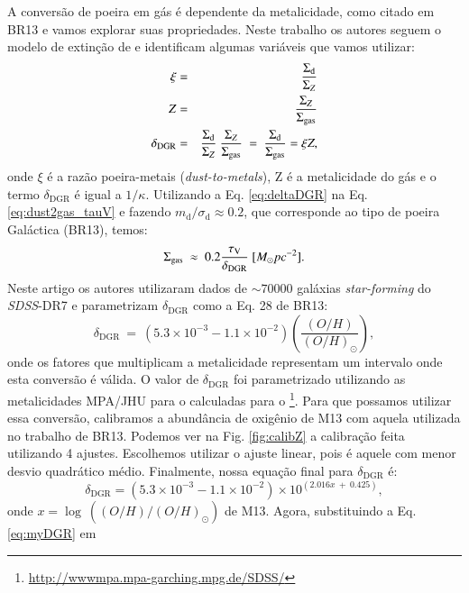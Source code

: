 A conversão de poeira em gás é dependente da metalicidade, como citado em BR13 e vamos explorar suas
propriedades. Neste trabalho os autores seguem o modelo de extinção de \citet{Charlot.Fall.2000a} e
identificam algumas variáveis que vamos utilizar:
\begin{eqnarray}
	\xi &=& \frac{\Sigma_{\mathrm{d}}}{\Sigma_Z} \\
	Z &=& \frac{\Sigma_Z}{\SigmaGas}  \\
	\delta_{\mathrm{DGR}} &=& \frac{\Sigma_{\mathrm{d}}}{\Sigma_Z}\	\frac{\Sigma_Z}{\SigmaGas}\ =\ \frac{\Sigma_{\mathrm{d}}}{\SigmaGas} = \xi Z,
	\label{eq:deltaDGR}
\end{eqnarray}
\noindent onde $\xi$ é a razão poeira-metais ({\em dust-to-metals}), Z é a metalicidade do gás e o
termo $\delta_{\mathrm{DGR}}$ é igual a $1/\kappa$. Utilizando a Eq. \ref{eq:deltaDGR} na Eq.
\ref{eq:dust2gas_tauV} e fazendo $m_{\mathrm{d}}/\sigma_{\mathrm{d}} \approx 0.2$, que corresponde
ao tipo de poeira Galáctica (BR13), temos:
\begin{equation}
	\Sigma_{\mathrm{gas}}\ \approx\ 0.2 \frac{\tau_{\mathrm{V}}}{\delta_{\mathrm{DGR}}}\ [M_\odot pc^{-2}].
	\label{eq:SigmaGasBR}
\end{equation}
Neste artigo os autores utilizaram dados de $\sim 70000$ galáxias {\em star-forming} do
\textit{SDSS}-DR7 e parametrizam $\delta_{\mathrm{DGR}}$ como a Eq. 28 de BR13:
\begin{equation}
	\delta_{\mathrm{DGR}}\ =\ (5.3 \times 10^{-3} - 1.1 \times 10^{-2})
\left(\frac{(O/H)}{(O/H)_\odot}\right),
	\label{eq:DGR_brinch_eq28}
\end{equation}
\noindent onde os fatores que multiplicam a metalicidade representam um intervalo onde esta
conversão é válida. O valor de $\delta_{\mathrm{DGR}}$ foi parametrizado utilizando as metalicidades
MPA/JHU para o calculadas para o
\SDSS\footnote{\href{http://wwwmpa.mpa-garching.mpg.de/SDSS/}{http://wwwmpa.mpa-garching.mpg.de/SDSS/}}.
Para que possamos utilizar essa conversão, calibramos a abundância de oxigênio de M13 com aquela
utilizada no trabalho de BR13. Podemos ver na Fig. \ref{fig:calibZ} a calibração feita utilizando 4
ajustes. Escolhemos utilizar o ajuste linear, pois é aquele com menor desvio quadrático médio.
Finalmente, nossa equação final para $\delta_{\mathrm{DGR}}$ é:
\begin{equation}
	\delta_{\mathrm{DGR}} =  (5.3 \times 10^{-3} - 1.1 \times 10^{-2}) \times 10^{\left(2.016 x\ +\ 0.425\right)},
	\label{eq:myDGR}
\end{equation}
\noindent onde $x = \log\ ((O/H)/(O/H)_\odot)$ de M13. Agora, substituindo a Eq. \ref{eq:myDGR} em
